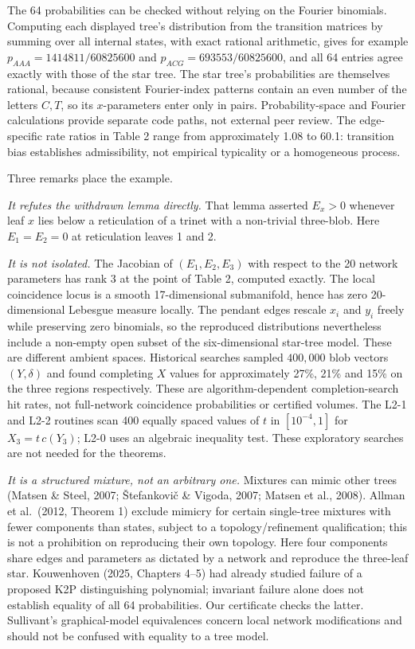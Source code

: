 \documentclass[
  11pt,
]{article}
\begin{document}
The 64 probabilities can be checked without relying on the Fourier
binomials. Computing each displayed tree's distribution from the
transition matrices by summing over all internal states, with exact
rational arithmetic, gives for example \(p_{AAA} = 1414811/60825600\)
and \(p_{ACG} = 693553/60825600\), and all 64 entries agree exactly with
those of the star tree. The star tree's probabilities are themselves
rational, because consistent Fourier-index patterns contain an even
number of the letters \(C,T\), so its \(x\)-parameters enter only in
pairs. Probability-space and Fourier calculations provide separate code
paths, not external peer review. The edge-specific rate ratios in Table
2 range from approximately 1.08 to 60.1: transition bias establishes
admissibility, not empirical typicality or a homogeneous process.

Three remarks place the example.

\emph{It refutes the withdrawn lemma directly.} That lemma asserted
\(E_x>0\) whenever leaf \(x\) lies below a reticulation of a trinet with
a non-trivial three-blob. Here \(E_1 = E_2 = 0\) at reticulation leaves
1 and 2.

\emph{It is not isolated.} The Jacobian of \((E_1,E_2,E_3)\) with
respect to the 20 network parameters has rank 3 at the point of Table 2,
computed exactly. The local coincidence locus is a smooth 17-dimensional
submanifold, hence has zero 20-dimensional Lebesgue measure locally. The
pendant edges rescale \(x_i\) and \(y_i\) freely while preserving zero
binomials, so the reproduced distributions nevertheless include a
non-empty open subset of the six-dimensional star-tree model. These are
different ambient spaces. Historical searches sampled \(400{,}000\) blob
vectors \((Y,\delta)\) and found completing \(X\) values for
approximately 27\%, 21\% and 15\% on the three regions respectively.
These are algorithm-dependent completion-search hit rates, not
full-network coincidence probabilities or certified volumes. The L2-1
and L2-2 routines scan 400 equally spaced values of \(t\) in
\([10^{-4},1]\) for \(X_3=t\,c(Y_3)\); L2-0 uses an algebraic inequality
test. These exploratory searches are not needed for the theorems.

\emph{It is a structured mixture, not an arbitrary one.} Mixtures can
mimic other trees (Matsen \& Steel, 2007; Štefankovič \& Vigoda, 2007;
Matsen et al., 2008). Allman et al.~(2012, Theorem 1) exclude mimicry
for certain single-tree mixtures with fewer components than states,
subject to a topology/refinement qualification; this is not a
prohibition on reproducing their own topology. Here four components
share edges and parameters as dictated by a network and reproduce the
three-leaf star. Kouwenhoven (2025, Chapters 4--5) had already studied
failure of a proposed K2P distinguishing polynomial; invariant failure
alone does not establish equality of all 64 probabilities. Our
certificate checks the latter. Sullivant's graphical-model equivalences
concern local network modifications and should not be confused with
equality to a tree model.
\end{document}
